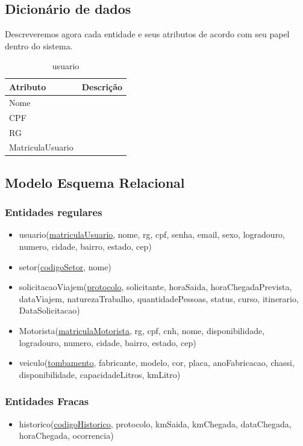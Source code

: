\documentclass[11pt]{article}
\begin{document}
\subsection{Dicionário de dados}
Descreveremos agora cada entidade e seus atributos de acordo com seu papel dentro do sistema.
\begin{table}[htp]\centering
\begin{tabular}{|l||l|}
\hline
Atributo & Descrição \\ \hline \hline
Nome &  \\ \hline
CPF &  \\ \hline
RG &  \\ \hline
MatriculaUsuario &  \\ \hline
\end{tabular}
\caption{usuario}
\end{table}

\subsection{Modelo Esquema Relacional}

\subsubsection{Entidades regulares}
\begin{itemize}
\item usuario(\underline{matriculaUsuario}, nome, rg, cpf, senha,
email, sexo, logradouro, numero, cidade, bairro, estado, cep)

\item setor(\underline{codigoSetor}, nome)

\item solicitacaoViajem(\underline{protocolo}, solicitante, horaSaida, horaChegadaPrevista, dataViajem, naturezaTrabalho, quantidadePessoas, status, curso, itinerario, DataSolicitacao)

\item Motorista(\underline{matriculaMotorista}, rg, cpf, cnh, nome, disponibilidade, logradouro, numero, cidade, bairro, estado, cep)

\item veiculo(\underline{tombamento}, fabricante, modelo, cor, placa, anoFabricacao, chassi, disponibilidade, capacidadeLitros, kmLitro)
\end{itemize}

\subsubsection{Entidades Fracas}
\begin{itemize}

\item historico(\underline{codigoHistorico}, protocolo, kmSaida, kmChegada, dataChegada, horaChegada, ocorrencia)

\end{itemize}
\end{document}
